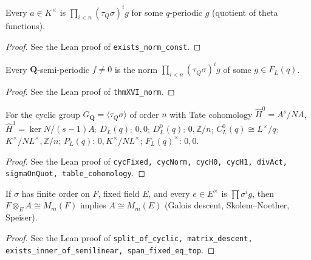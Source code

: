 \begin{lemma}
\label{lem:s5-norm-const}
\leanok
Every $a\in K^\times$ is $\prod_{i<n}(\tau_Q\sigma)^i g$ for some $q$-periodic $g$ (quotient of theta functions).
\end{lemma}
\begin{proof}
\leanok
See the Lean proof of \texttt{exists\_norm\_const}.
\end{proof}

\begin{theorem}
\label{thm:XVI}
\leanok
Every $\mathbf Q$-semi-periodic $f\ne0$ is the norm $\prod_{i<n}(\tau_Q\sigma)^ig$ of some $g\in F_L(q)$.
\end{theorem}
\begin{proof}
\leanok
See the Lean proof of \texttt{thmXVI\_norm}.
\end{proof}

\begin{theorem}
\label{tab:cohomology}
\leanok
For the cyclic group $G_{\mathbf Q}=\langle\tau_Q\sigma\rangle$ of order $n$ with Tate cohomology $\hat H^0=A^s/NA$, $\hat H^1=\ker N/(s-1)A$: $D_L(q)$: $0,0$; $D^0_L(q)$: $0,\mathbb Z/n$; $C^0_L(q)\cong L^\times/q$: $K^\times/NL^\times,\mathbb Z/n$; $P_L(q)$: $0,K^\times/NL^\times$; $F_L(q)^\times$: $0,0$.
\end{theorem}
\begin{proof}
\leanok
See the Lean proof of \texttt{cycFixed, cycNorm, cycH0, cycH1, divAct, sigmaOnQuot, table\_cohomology}.
\end{proof}

\begin{lemma}
\label{lem:s5-split-cyclic}
\leanok
If $\sigma$ has finite order on $F$, fixed field $E$, and every $e\in E^\times$ is $\prod\sigma^i g$, then $F\otimes_E A\cong M_m(F)$ implies $A\cong M_m(E)$ (Galois descent, Skolem--Noether, Speiser).
\end{lemma}
\begin{proof}
\leanok
See the Lean proof of \texttt{split\_of\_cyclic, matrix\_descent, exists\_inner\_of\_semilinear, span\_fixed\_eq\_top}.
\end{proof}

